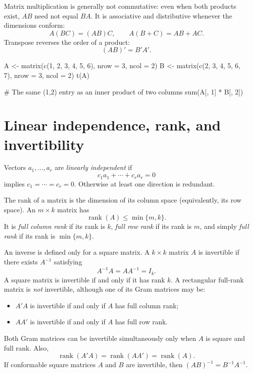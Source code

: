 Matrix multiplication is generally not commutative: even when both products
exist, $AB$ need not equal $BA$.  It is associative and distributive whenever
the dimensions conform:
\[
  A(BC)=(AB)C,\qquad A(B+C)=AB+AC.
\]
Transpose reverses the order of a product:
\[
  (AB)'=B'A'.
\]

\begin{rcode}
A <- matrix(c(1, 2, 3, 4, 5, 6), nrow = 3, ncol = 2)
B <- matrix(c(2, 3, 4, 5, 6, 7), nrow = 3, ncol = 2)
t(A) %

# The same (1,2) entry as an inner product of two columns
sum(A[, 1] * B[, 2])
\end{rcode}

\section{Linear independence, rank, and invertibility}

Vectors $a_1,\ldots,a_r$ are \emph{linearly independent} if
\[
  c_1a_1+\cdots+c_ra_r=0
\]
implies $c_1=\cdots=c_r=0$.  Otherwise at least one direction is redundant.

\begin{definition}
The rank of a matrix is the dimension of its column space (equivalently, its
row space).  An $m\times k$ matrix has
\[
  \operatorname{rank}(A)\leq \min\{m,k\}.
\]
It is \emph{full column rank} if its rank is $k$, \emph{full row rank} if its
rank is $m$, and simply \emph{full rank} if its rank is
$\min\{m,k\}$.
\end{definition}

An inverse is defined only for a square matrix.  A $k\times k$ matrix $A$ is
invertible if there exists $A^{-1}$ satisfying
\[
  A^{-1}A=AA^{-1}=I_k.
\]
A square matrix is invertible if and only if it has rank $k$.  A rectangular
full-rank matrix is \emph{not} invertible, although one of its Gram matrices
may be:
\begin{itemize}
  \item $A'A$ is invertible if and only if $A$ has full column rank;
  \item $AA'$ is invertible if and only if $A$ has full row rank.
\end{itemize}
Both Gram matrices can be invertible simultaneously only when $A$ is square
and full rank.  Also,
\[
  \operatorname{rank}(A'A)=\operatorname{rank}(AA')
  =\operatorname{rank}(A).
\]
If conformable square matrices $A$ and $B$ are invertible, then
$(AB)^{-1}=B^{-1}A^{-1}$.

